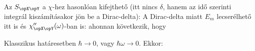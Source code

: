   Az $S_{\opX\opY}$ a $\chi$-hez hasonlóan kifejthető (itt nincs $\delta$, hanem az idő szerinti integrál kiszámításakor jön be a Dirac-delta):
  A Dirac-delta miatt $E_m$ lecserélhető itt is és $\chi_{\opX\opY}''(\omega)$-ban is:
  ahonnan következik, hogy 
  
  Klasszikus határesetben $\hbar\to 0$, vagy $\hbar\omega\to 0$.
   Ekkor:
